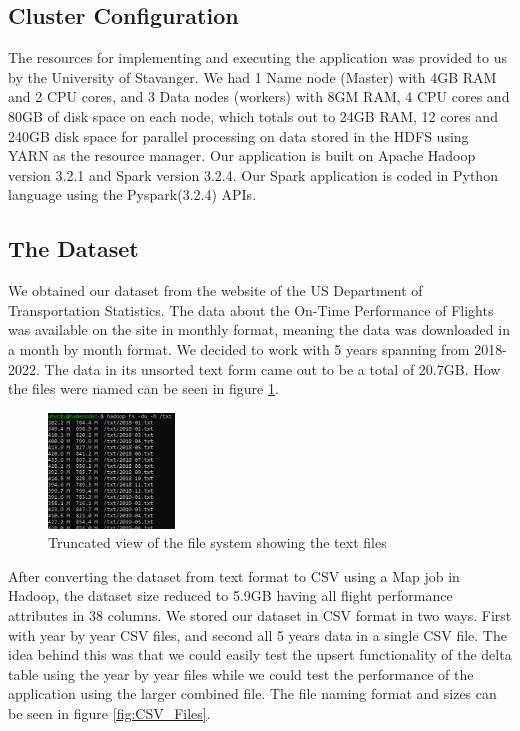 \subsection{Cluster Configuration} 
The resources for implementing and executing the application was provided to us by the University of Stavanger. We had 1 Name node (Master) with 4GB RAM and 2 CPU cores, and 3 Data nodes (workers) with 8GM RAM, 4 CPU cores and 80GB of disk space on each node, which totals out to 24GB RAM, 12 cores and 240GB disk space for parallel processing on data stored in the HDFS using YARN as the resource manager. Our application is built on Apache Hadoop version 3.2.1 and Spark version 3.2.4. Our Spark application is coded in Python language using the Pyspark(3.2.4) APIs. 


\subsection{The Dataset}
We obtained our dataset from the website of the US Department of Transportation Statistics. The data about the On-Time Performance of Flights was available on the site in monthly format, meaning the data was downloaded in a month by month format. We decided to work with 5 years spanning from 2018-2022. The data in its unsorted text form came out to be a total of 20.7GB. How the files were named can be seen in figure \ref{fig:Text_Files_size}.

\begin{figure}[H]
\centering
\includegraphics[width=0.30\textwidth]{fig/unstructured_dataset_size.png}
\caption{Truncated view of the file system showing the text files}
\label{fig:Text_Files_size}
\end{figure}

After converting the dataset from text format to CSV using a Map job in Hadoop, the dataset size reduced to 5.9GB having all flight performance attributes in 38 columns. We stored our dataset in CSV format in two ways. First with year by year CSV files, and second all 5 years data in a single CSV file. The idea behind this was that we could easily test the upsert functionality of the delta table using the year by year files while we could test the performance of the application using the larger combined file. The file naming format and sizes can be seen in figure \ref{fig:CSV_Files}.

